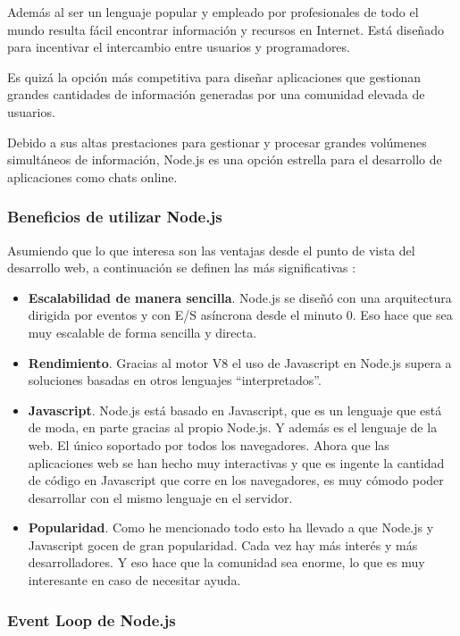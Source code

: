 Además al ser un lenguaje popular y empleado por profesionales de todo el mundo resulta fácil encontrar información y recursos en Internet. Está diseñado para incentivar el intercambio entre usuarios y programadores.

Es quizá la opción más competitiva para diseñar aplicaciones que gestionan grandes cantidades de información generadas por una comunidad elevada de usuarios.

Debido a sus altas prestaciones para gestionar y procesar grandes volúmenes simultáneos de información, Node.js es una opción estrella para el desarrollo de aplicaciones como chats online.

\subsubsection{Beneficios de utilizar Node.js}

Asumiendo que lo que interesa son las ventajas desde el punto de vista del desarrollo web, a continuación se definen las más significativas \cite{nodejs9}:

\begin{itemize}
  \item \textbf{Escalabilidad de manera sencilla}. Node.js se diseñó con una arquitectura dirigida por eventos y con E/S asíncrona desde el minuto 0. Eso hace que sea muy escalable de forma sencilla y directa.
  \item \textbf{Rendimiento}. Gracias al motor V8 el uso de Javascript en Node.js supera a soluciones basadas en otros lenguajes “interpretados”.
  \item \textbf{Javascript}. Node.js está basado en Javascript, que es un lenguaje que está de moda, en parte gracias al propio Node.js. Y además es el lenguaje de la web. El único soportado por todos los navegadores. Ahora que las aplicaciones web se han hecho muy interactivas y que es ingente la cantidad de código en Javascript que corre en los navegadores, es muy cómodo poder desarrollar con el mismo lenguaje en el servidor.
  \item \textbf{Popularidad}. Como he mencionado todo esto ha llevado a que Node.js y Javascript gocen de gran popularidad. Cada vez hay más interés y más desarrolladores. Y eso hace que la comunidad sea enorme, lo que es muy interesante en caso de necesitar ayuda.
\end{itemize}

\subsubsection{Event Loop de Node.js}


